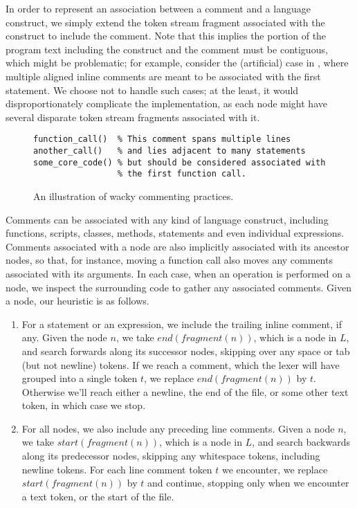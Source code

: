 In order to represent an association between a comment and a language
construct, we simply extend the token stream fragment associated with the
construct to include the comment. Note that this implies the portion of the
program text including the construct and the comment must be contiguous,
which might be problematic; for example, consider the (artificial) case
in , where multiple aligned inline comments are
meant to be associated with the first statement. We choose not to handle
such cases; at the least, it would disproportionately complicate the
implementation, as each node might have several disparate token stream
fragments associated with it.

\begin{figure}
\begin{lstlisting}[numbers=none, keepspaces=true]
function_call()  % This comment spans multiple lines
another_call()   % and lies adjacent to many statements
some_core_code() % but should be considered associated with
                 % the first function call.
\end{lstlisting}
\caption{An illustration of wacky commenting practices.}
\label{Fig:WackyComments}
\end{figure}

Comments can be associated with any kind of language construct, including
functions, scripts, classes, methods, statements and even individual
expressions. Comments associated with a node are also implicitly associated
with its ancestor nodes, so that, for instance, moving a function call also
moves any comments associated with its arguments. In each case, when an
operation is performed on a node, we inspect the surrounding code to gather any
associated comments. Given a node, our heuristic is as follows.

\begin{enumerate}
  \item For a statement or an expression, we include the trailing inline
    comment, if any. Given the node $n$, we take $end(fragment(n))$, which is a
    node in $L$, and search forwards along its successor nodes, skipping over
    any space or tab (but not newline) tokens. If we reach a comment, which the
    lexer will have grouped into a single token $t$, we replace
    $end(fragment(n))$ by $t$. Otherwise we'll reach either a newline, the end
    of the file, or some other text token, in which case we stop.
  \item For all nodes, we also include any preceding line comments. Given
    a node $n$, we take $start(fragment(n))$, which is a node in $L$, and
    search backwards along its predecessor nodes, skipping any whitespace
    tokens, including newline tokens. For each line comment token $t$ we
    encounter, we replace $start(fragment(n))$ by $t$ and continue, stopping
    only when we encounter a text token, or the start of the file.
\end{enumerate}

